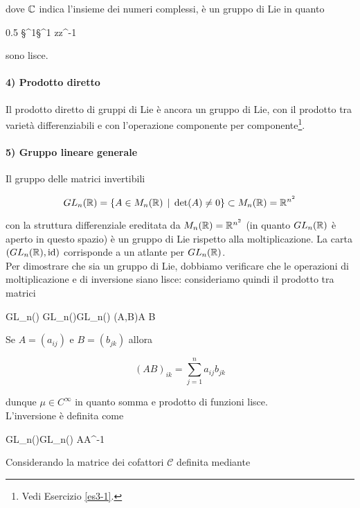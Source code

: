 dove $ \mathbb{C} $ indica l'insieme dei numeri complessi, è un gruppo di Lie in quanto

	{0.5}{%
				{\S^{1}}{\S^{1}}
				{z}{z^{-1}}
			}

sono lisce.

\paragraph{4) Prodotto diretto}

Il prodotto diretto di gruppi di Lie è ancora un gruppo di Lie, con il prodotto tra varietà differenziabili e con l'operazione componente per componente\footnote{%
	Vedi Esercizio \ref{es3-1}.%
}.

\paragraph{5) Gruppo lineare generale}

Il gruppo delle matrici invertibili

\begin{equation}
	GL_{n}(\mathbb{R}) = \{ A \in M_{n}(\mathbb{R}) \, \mid \, \det(A) \neq 0 \} \subset M_{n}(\mathbb{R}) = \mathbb{R}^{n^{2}}
\end{equation}

con la struttura differenziale ereditata da $ M_{n}(\mathbb{R}) = \mathbb{R}^{n^{2}} $ (in quanto $ GL_{n}(\mathbb{R}) $ è aperto in questo spazio) è un gruppo di Lie rispetto alla moltiplicazione. La carta $ (GL_{n}(\mathbb{R}),\operatorname{id}) $ corrisponde a un atlante per $ GL_{n}(\mathbb{R}) $.\\
Per dimostrare che sia un gruppo di Lie, dobbiamo verificare che le operazioni di moltiplicazione e di inversione siano lisce: consideriamo quindi il prodotto tra matrici

\map{\mu}
	{GL_{n}(\R) \times GL_{n}(\R)}{GL_{n}(\R)}
	{(A,B)}{A B}

Se $ A = (a_{ij}) $ e $ B = (b_{jk}) $ allora

\begin{equation}
	(A B)_{ik} = \sum_{j=1}^{n} a_{ij} b_{jk}
\end{equation}

dunque $ \mu \in C^{\infty} $ in quanto somma e prodotto di funzioni lisce.\\
L'inversione è definita come

	{GL_{n}(\R)}{GL_{n}(\R)}
	{A}{A^{-1}}

Considerando la matrice dei cofattori $ \mathcal{C} $ definita mediante

